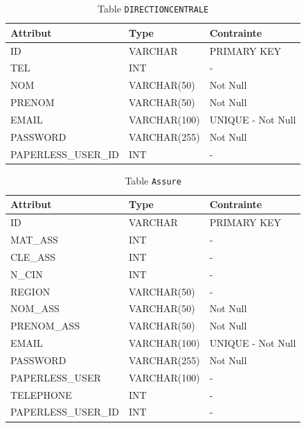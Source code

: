\begin{table}[h!]
\centering
\begin{tabular}{|l|l|l|}
\hline
\textbf{Attribut} & \textbf{Type} & \textbf{Contrainte} \\
\hline
ID & VARCHAR & PRIMARY KEY \\
TEL & INT & - \\
NOM & VARCHAR(50) & Not Null \\
PRENOM & VARCHAR(50) & Not Null \\
EMAIL & VARCHAR(100) & UNIQUE - Not Null \\
PASSWORD & VARCHAR(255) & Not Null \\
PAPERLESS\_USER\_ID & INT & - \\
\hline
\end{tabular}
\caption{Table \texttt{DIRECTIONCENTRALE}}
\end{table}

\begin{table}[h!]
\centering
\begin{tabular}{|l|l|l|}
\hline
\textbf{Attribut} & \textbf{Type} & \textbf{Contrainte} \\
\hline
ID & VARCHAR & PRIMARY KEY \\
MAT\_ASS & INT & - \\
CLE\_ASS & INT & - \\
N\_CIN & INT & - \\
REGION & VARCHAR(50) & - \\
NOM\_ASS & VARCHAR(50) & Not Null \\
PRENOM\_ASS & VARCHAR(50) & Not Null \\
EMAIL & VARCHAR(100) & UNIQUE - Not Null \\
PASSWORD & VARCHAR(255) & Not Null \\
PAPERLESS\_USER & VARCHAR(100) & - \\
TELEPHONE & INT & - \\
PAPERLESS\_USER\_ID & INT & - \\
\hline
\end{tabular}
\caption{Table \texttt{Assure}}
\end{table}

